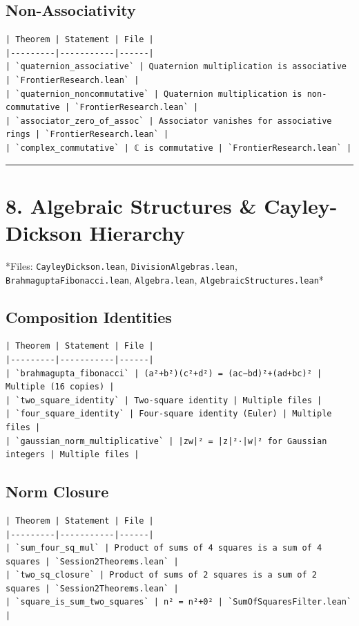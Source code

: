 \documentclass[12pt,a4paper,openany]{book}
\begin{document}
\subsection{Non-Associativity}
\begin{verbatim}
| Theorem | Statement | File |
|---------|-----------|------|
| `quaternion_associative` | Quaternion multiplication is associative | `FrontierResearch.lean` |
| `quaternion_noncommutative` | Quaternion multiplication is non-commutative | `FrontierResearch.lean` |
| `associator_zero_of_assoc` | Associator vanishes for associative rings | `FrontierResearch.lean` |
| `complex_commutative` | ℂ is commutative | `FrontierResearch.lean` |
\end{verbatim}

\bigskip\hrule\bigskip

\section{8. Algebraic Structures \& Cayley-Dickson Hierarchy}

*Files: \texttt{CayleyDickson.lean}, \texttt{DivisionAlgebras.lean}, \texttt{BrahmaguptaFibonacci.lean}, \texttt{Algebra.lean}, \texttt{AlgebraicStructures.lean}*

\subsection{Composition Identities}
\begin{verbatim}
| Theorem | Statement | File |
|---------|-----------|------|
| `brahmagupta_fibonacci` | (a²+b²)(c²+d²) = (ac−bd)²+(ad+bc)² | Multiple (16 copies) |
| `two_square_identity` | Two-square identity | Multiple files |
| `four_square_identity` | Four-square identity (Euler) | Multiple files |
| `gaussian_norm_multiplicative` | |zw|² = |z|²·|w|² for Gaussian integers | Multiple files |
\end{verbatim}

\subsection{Norm Closure}
\begin{verbatim}
| Theorem | Statement | File |
|---------|-----------|------|
| `sum_four_sq_mul` | Product of sums of 4 squares is a sum of 4 squares | `Session2Theorems.lean` |
| `two_sq_closure` | Product of sums of 2 squares is a sum of 2 squares | `Session2Theorems.lean` |
| `square_is_sum_two_squares` | n² = n²+0² | `SumOfSquaresFilter.lean` |
\end{verbatim}
\end{document}
